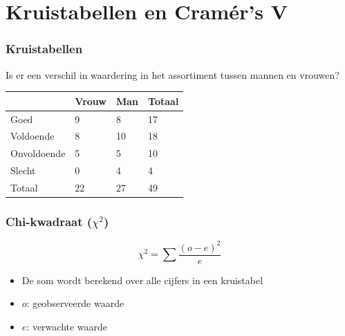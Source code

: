 \documentclass[aspectratio=169]{beamer}
\begin{document}
\begin{frame}
\begin{columns}
\begin{column}{0.3\textwidth}
    \end{column}
  \end{columns}
\end{frame}

\section{Kruistabellen en Cramér's V}

\begin{frame}
  \frametitle{Kruistabellen}
  Is er een verschil in waardering in het assortiment tussen mannen en vrouwen?

  \begin{table}[h]
    \begin{tabular}{l||l|l||l}
      & Vrouw & Man & Totaal \\ \hline \hline
      Goed        & 9     & 8   & 17     \\
      Voldoende   & 8     & 10  & 18     \\
      Onvoldoende & 5     & 5   & 10     \\
      Slecht      & 0     & 4   & 4      \\ \hline \hline
      Totaal      & 22    & 27  & 49     \\
    \end{tabular}
  \end{table}
\end{frame}

\begin{frame}
  \frametitle{Chi-kwadraat ($\chi^2$) }
  
  
  \[ \chi^2 = \sum \frac{(o - e)^2}{e} \]
  
  \begin{itemize}
    \item De som wordt berekend over alle cijfers in een kruistabel
    \item $o$: geobserveerde waarde
    \item $e$: verwachte waarde
  \end{itemize}
\end{frame}
\end{document}
